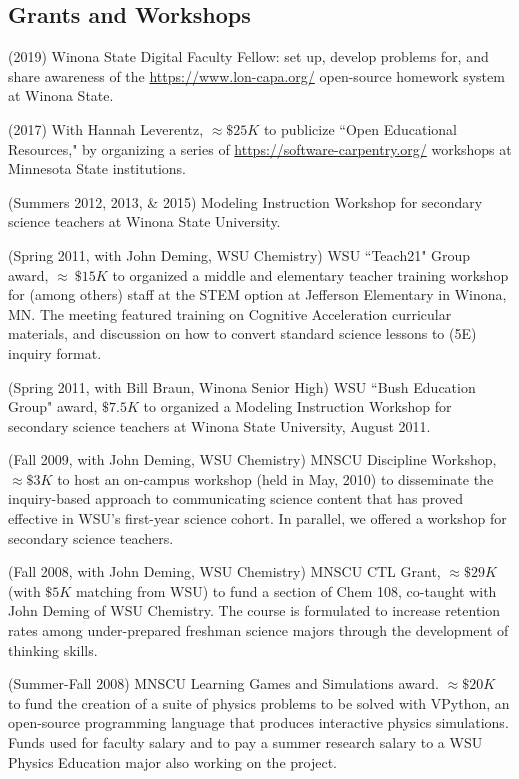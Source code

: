 \documentclass[margin,line,letterpaper]{res}
\begin{document}
\begin{resume}
\section{\bf Grants and Workshops}

(2019) Winona State Digital Faculty Fellow: set up, develop problems for, and share awareness of the \url{https://www.lon-capa.org/} open-source homework system at Winona State. 

(2017) With Hannah Leverentz, $\approx\$25K$ to publicize ``Open Educational Resources," by organizing a series of \url{https://software-carpentry.org/} workshops at Minnesota State institutions.

(Summers 2012, 2013, \& 2015) 
Modeling Instruction Workshop for secondary science teachers at Winona State University.

(Spring 2011, with John Deming, WSU Chemistry) WSU ``Teach21" Group award, $\approx ~\$15K$ to organized a middle and elementary teacher training workshop for (among others) staff at the STEM option at Jefferson Elementary in Winona, MN.  The meeting featured training on Cognitive Acceleration curricular materials, and discussion on how to convert standard science lessons to (5E) inquiry format.

(Spring 2011, with Bill Braun, Winona Senior High) WSU ``Bush Education Group" award, $\$7.5K$ to organized a Modeling Instruction Workshop for secondary science teachers at Winona State University, August 2011.

(Fall 2009, with John Deming, WSU Chemistry)  MNSCU Discipline Workshop, $\approx \$3K$ to host an on-campus workshop (held in May, 2010) to disseminate the inquiry-based approach to communicating science content that has proved effective in WSU's first-year science cohort. In parallel, we offered a workshop for secondary science teachers. 

(Fall 2008, with John Deming, WSU Chemistry) MNSCU CTL Grant, $\approx \$29K$ (with $\$5K$ matching from WSU) to fund a section of Chem 108, co-taught with John Deming of WSU Chemistry.  The course is formulated to increase retention rates among under-prepared freshman science majors through the development of thinking skills.

(Summer-Fall 2008) MNSCU Learning Games and Simulations award.  $\approx \$20K$ to fund the creation of a suite of physics problems to be solved with VPython, an open-source programming language that produces interactive physics simulations.  Funds used for faculty salary and to pay a summer research salary to a WSU Physics Education major also working on the project.


\end{resume}
\end{document}
